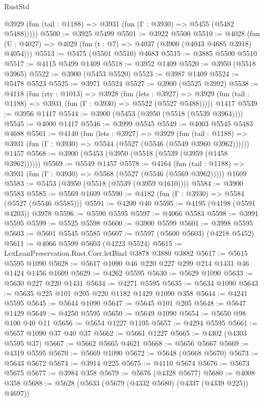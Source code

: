 \begin{lexlean}{RustStd}
\begin{coremodule}
      @3929 (fun (tail : @1188) => @3931 (fun (Γ : @3930) => @5455 (@5482 @5488)))))
@5500 := @3925 @5499
@5501 := @3922 @5500
@5510 := @4028 (fun (U : @4027) => @4029 (fun (t : @7) => @4037 (@3900 (@4043 @4685 @3918) @4054)))
@5513 := @5475 (@5501 @5510) @4683
@5515 := @3885 @5500 @5510
@5517 := @4115 @5499 @1409
@5518 := @3952 @1409
@5520 := @3950 (@5518 @3965)
@5522 := @3900 (@5453 @5520)
@5523 := @3987 @1409
@5524 := @5478 @5523
@5525 := @3971 @5524
@5527 := @3900 (@5525 @3992)
@5538 := @4118
    (fun (rty : @1013) =>
    @3928
      (fun (lets : @3927) =>
      @3929 (fun (tail : @1188) => @3931 (fun (Γ : @3930) => @5522 (@5527 @5488)))))
    @1417
@5539 := @3956 @1417
@5544 := @3900 (@5453 (@3950 (@5518 (@5539 @3964))))
@5545 := @4000 @1417
@5546 := @3999 @5545
@5549 := @4003 @5545 @5483 @4688
@5561 := @4140
    (fun (lets : @3927) =>
    @3929
      (fun (tail : @1188) => @3931 (fun (Γ : @3930) => @5544 (@5527 (@5546 (@5549 @3960 @3962))))))
    @1457
@5568 := @3900 (@5453 (@3950 (@5518 (@5539 (@3959 (@1458 @3962))))))
@5569 := @5549 @1457
@5578 := @4164
    (fun (tail : @1188) => @3931 (fun (Γ : @3930) => @5568 (@5527 (@5546 (@5569 @3962)))))
    @1609
@5583 := @5453 (@3950 (@5518 (@5539 (@3959 @1610))))
@5584 := @3900 @5583
@5585 := @5569 @1609
@5590 := @4182 (fun (Γ : @3930) => @5584 (@5527 (@5546 @5585)))
@5591 := @4200 @40
@5595 := @4195 (@4198 (@5591 @4203)) @3978
@5596 := @5590 @5595
@5597 := @4066 @5583
@5598 := @3991 @5595
@5599 := @5525 @5598
@5600 := @3900 @5599
@5601 := @3998 @5595
@5603 := @5601 @5545 @5585
@5607 := @5597 (@5600 @5603) (@4218 @5452)
@5611 := @4066 @5599 @5603 (@4223 @5524)
@5615 := LexLeanPreservation.Rust.Corr.letBind @3878 @3880 @3882
@5617 := @5615 @5595 @1090
@5628 := @5617 @1090 @46 @220 @227 @299 @214 @1431 @46 @1424 @1456 @1609
@5629 := @4262 @5595
@5630 := @5629 @1090
@5633 := @5630 @227 @220 @1431
@5634 := @4271 @5595
@5635 := @5634 @1090
@5643 := @5635 @225 @101 @205 @220 @1182 @1429 @1090 @358
@5644 := @4241 @5595
@5645 := @5644 @1090
@5647 := @5645 @101 @205
@5648 := @5647 @1429
@5649 := @4250 @5595
@5650 := @5649 @1090
@5654 := @5650 @98 @100 @40 @11
@5656 := @5654 @1227 @1195
@5657 := @4294 @5595
@5661 := @5657 @1090 @37 @40 @37
@5662 := @5661 @1227
@5665 := @4302 (@4303 @5595 @37)
@5667 := @5662 @5665 @4621
@5668 := @5656 @5667
@5669 := @4319 @5595
@5670 := @5669 @1090
@5672 := @5648 (@5668 @5670)
@5673 := @5643 @5672
@5674 := @3914 @225
@5675 := @4110 @5674
@5676 := @5673 @5675
@5677 := @3984 @358
@5679 := @5676 (@4328 @5677)
@5680 := @4008 @358
@5688 := @5628 (@5633 (@5679 (@4332 @5680) (@4337 (@4339 @225)) @4697))

\end{coremodule}
\end{lexlean}
